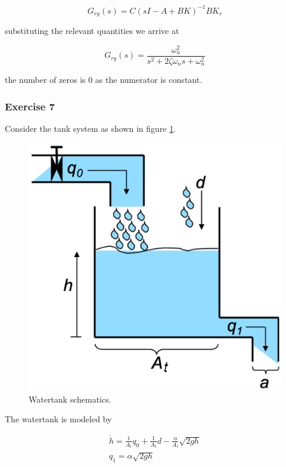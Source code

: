 \begin{equation}
G_{ry}(s) = C(sI - A + BK)^{-1}BK_r \nonumber
\end{equation}

substituting the relevant quantities we arrive at

\begin{equation}
G_{ry}(s) = \frac{\omega_{n}^{2}}{s^2 + 2\zeta\omega_n s + \omega_{n}^{2}}  \nonumber
\end{equation}

the number of zeros is 0 as the numerator is constant.

\subsubsection{Exercise 7}

Consider the tank system as shown in  figure \ref{Watertank_09}.
\begin{figure}[!htb]
\begin{center}
\includegraphics[scale=0.280]{img/state_feedback/Watertank_09.png}
\end{center}
\caption{Watertank schematics.}
\label{Watertank_09}
\end{figure}
The watertank is modeled by

\begin{eqnarray}
\dot{h} = \frac{1}{A_t}q_0 + \frac{1}{A_t}d - \frac{\alpha}{A_t}\sqrt{2gh} \nonumber \\
q_1 = \alpha \sqrt{2gh}   \nonumber
\end{eqnarray}

